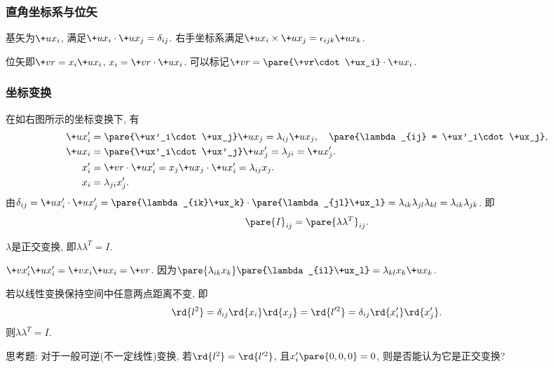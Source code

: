 \documentclass[hidelinks]{ctexart}
\begin{document}

\subsubsection{直角坐标系与位矢} %
\label{ssub:直角坐标系与位矢}

基矢为$\+ux_i$, 满足$\+ux_i \cdot \+ux_j = \delta_{ij}$. 右手坐标系满足$\+ux_i\times\+ux_j = \epsilon_{ijk}\+ux_k$.
\par
位矢即$\+vr = x_i\+ux_i$, $x_i = \+vr \cdot \+ux_i$. 可以标记$\+vr = \pare{\+vr\cdot\+ux_i}\cdot\+ux_i$.


\subsubsection{坐标变换} %
\label{ssub:坐标变换}

\begin{figure}[ht]
    \centering
\end{figure}

在如右图所示的坐标变换下, 有
\begin{align*}
    \+ux'_i &= \pare{\+ux'_i\cdot\+ux_j}\+ux_j = \lambda_{ij}\+ux_j,\quad \pare{\lambda_{ij} = \+ux'_i\cdot\+ux_j}, \\
    \+ux_i &= \pare{\+ux'_i\cdot\+ux'_j} \+ux'_j = \lambda_{ji} = \+ux'_j. \\
    x'_i &= \+vr \cdot \+ux'_i = x_j\+ux_j\cdot\+ux'_i = \lambda_{ij}x_j. \\
    x_i &= \lambda_{ji}x'_j.
\end{align*}
由$\delta_{ij} = \+ux'_i\cdot\+ux'_j = \pare{\lambda_{ik}\+ux_k}\cdot\pare{\lambda_{jl}\+ux_l} = \lambda_{ik}\lambda_{jl}\lambda_{kl} = \lambda_{ik}\lambda_{jk}$. 即
\[ \pare{I}_{ij} = \pare{\lambda \lambda^T}_{ij}. \]
\begin{cenum}
    \item $\lambda$是正交变换, 即$\lambda \lambda^T = I$.
    \item $\+vx'_i \+ux'_i = \+vx_i \+ux_i = \+vr$. 因为$\pare{\lambda_{ik}x_k}\pare{\lambda_{il}\+ux_l} = \lambda_{kl}x_k\+ux_k$.
    \item 若以线性变换保持空间中任意两点距离不变,  即
    \[ \rd{l^2} = \delta_{ij}\rd{x_i}\rd{x_j} = \rd{l'^2} = \delta_{ij}\rd{x'_i}\rd{x'_j}. \]
    则$\lambda \lambda^T = I$.
\end{cenum}
\begin{ex}
    思考题: 对于一般可逆(不一定线性)变换, 若$\rd{l^2} = \rd{l'^2}$, 且$x'_i\pare{0,0,0} = 0$, 则是否能认为它是正交变换?
\end{ex}
\end{document}
